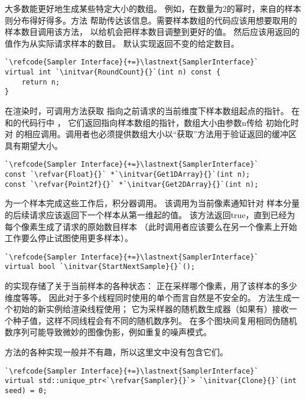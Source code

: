 大多数能更好地生成某些特定大小的数组。
例如，在数量为2的幂时，来自的样本
则分布得好得多。方法\linebreak
{}
帮助传达该信息。需要样本数组的代码应该用想要取用的样本数目调用该方法，
以给机会把样本数目调整到更好的值。
然后应该用返回的值作为从实际请求样本的数目。
默认实现返回不变的给定数目。
\begin{lstlisting}
`\refcode{Sampler Interface}{+=}\lastnext{SamplerInterface}`
virtual int `\initvar{RoundCount}{}`(int n) const {
    return n;
}
\end{lstlisting}

在渲染时，可调用方法获取
指向之前请求的当前维度下样本数组起点的指针。
在和的代码行中
，
它们返回指向样本数组的指针，数组大小由参数{\ttfamily n}传给
初始化时对
的相应调用。调用者也必须提供数组大小以“获取”方法用于验证返回的缓冲区具有期望大小。
\begin{lstlisting}
`\refcode{Sampler Interface}{+=}\lastnext{SamplerInterface}`  
const `\refvar{Float}{}` *`\initvar{Get1DArray}{}`(int n);
const `\refvar{Point2f}{}` *`\initvar{Get2DArray}{}`(int n);
\end{lstlisting}

为一个样本完成这些工作后，积分器调用。
该调用为当前像素通知针对
样本分量的后续请求应该返回下一个样本从第一维起的值。
该方法返回{\ttfamily true}，直到已经为每个像素生成了请求的原始数目样本
（此时调用者应该要么在另一个像素上开始工作要么停止试图使用更多样本）。
\begin{lstlisting}
`\refcode{Sampler Interface}{+=}\lastnext{SamplerInterface}`
virtual bool `\initvar{StartNextSample}{}`();
\end{lstlisting}

的实现存储了关于当前样本的各种状态：
正在采样哪个像素，用了该样本的多少维度等等。
因此对于多个线程同时使用的单个而言自然是不安全的。
方法生成一个初始的新实例给渲染线程使用；
它为采样器的随机数生成器（如果有）接收一个种子值，这样不同线程会有不同的随机数序列。
在多个图块间复用相同伪随机数序列可能导致微妙的图像伪影，例如重复的噪声模式。

方法的各种实现一般并不有趣，所以这里文中没有包含它们。
\begin{lstlisting}
`\refcode{Sampler Interface}{+=}\lastnext{SamplerInterface}`
virtual std::unique_ptr<`\refvar{Sampler}{}`> `\initvar{Clone}{}`(int seed) = 0;
\end{lstlisting}

